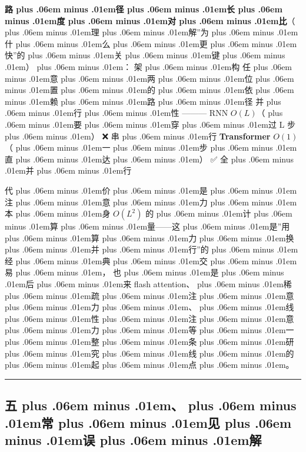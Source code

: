 \documentclass[
]{article}
\def\zh#1{{\zhfont #1}}
\def\emo#1{{\emofont #1}}
\def\zhglue{\hskip0pt plus .06em minus .01em}
\begin{document}
\textbf{\zh{路\zhglue 径\zhglue 长\zhglue 度\zhglue 对\zhglue 比}}\zh{（\zhglue 理\zhglue 解}''\zh{为\zhglue 什\zhglue 么\zhglue 更\zhglue 快}''\zh{的\zhglue 关\zhglue 键\zhglue ）\zhglue ：} \textbar{} \zh{架\zhglue 构} \textbar{} \zh{任\zhglue 意\zhglue 两\zhglue 位\zhglue 置\zhglue 的\zhglue 依\zhglue 赖\zhglue 路\zhglue 径} \textbar{} \zh{并\zhglue 行\zhglue 性} \textbar{} \textbar---\textbar---\textbar---\textbar{} \textbar{} RNN \textbar{} \(O(L)\)\zh{（\zhglue 要\zhglue 穿\zhglue 过} L \zh{步\zhglue ）} \textbar{} \emo{❌} \zh{串\zhglue 行} \textbar{} \textbar{} \textbf{Transformer} \textbar{} \textbf{\(O(1)\)}\zh{（\zhglue 一\zhglue 步\zhglue 直\zhglue 达\zhglue ）} \textbar{} \emo{✅} \zh{全\zhglue 并\zhglue 行} \textbar{}

\zh{代\zhglue 价\zhglue 是\zhglue 注\zhglue 意\zhglue 力\zhglue 本\zhglue 身} \(O(L^2)\) \zh{的\zhglue 计\zhglue 算\zhglue 量}------\zh{这\zhglue 是}''\zh{用\zhglue 算\zhglue 力\zhglue 换\zhglue 并\zhglue 行}''\zh{的\zhglue 经\zhglue 典\zhglue 交\zhglue 易\zhglue ，} \zh{也\zhglue 是\zhglue 后\zhglue 来} flash attention\zh{、\zhglue 稀\zhglue 疏\zhglue 注\zhglue 意\zhglue 力\zhglue 、\zhglue 线\zhglue 性\zhglue 注\zhglue 意\zhglue 力\zhglue 等\zhglue 一\zhglue 整\zhglue 条\zhglue 研\zhglue 究\zhglue 线\zhglue 的\zhglue 起\zhglue 点\zhglue 。}

\begin{center}\rule{0.5\linewidth}{0.5pt}\end{center}

\subsection{\zh{五\zhglue 、\zhglue 常\zhglue 见\zhglue 误\zhglue 解}}\label{ux4e94ux5e38ux89c1ux8befux89e3}
\end{document}
